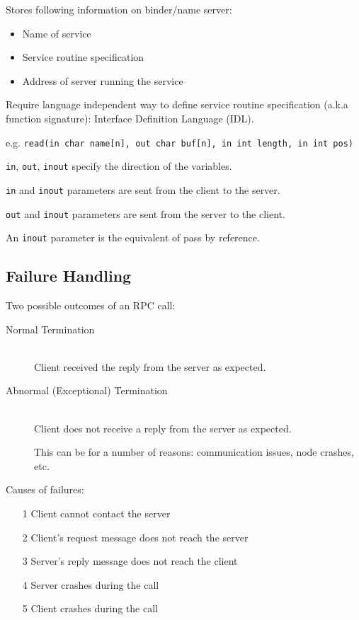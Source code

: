 \documentclass[a4paper]{article}
\begin{document}
Stores following information on binder/name server:

\begin{itemize}
  \item Name of service
  \item Service routine specification
  \item Address of server running the service
\end{itemize}

Require language independent way to define service routine specification
(a.k.a function signature): Interface Definition Language (IDL).

e.g. \texttt{read(in char name[n], out char buf[n], in int length, in int pos)}

\texttt{in}, \texttt{out}, \texttt{inout} specify the direction of the
variables.

\texttt{in} and \texttt{inout} parameters are sent from the client to the
server.

\texttt{out} and \texttt{inout} parameters are sent from the server to the
client.

An \texttt{inout} parameter is the equivalent of pass by reference.

\subsection{Failure Handling}

Two possible outcomes of an RPC call:

\begin{description}
  \item[Normal Termination] \hfill \\
    Client received the reply from the server as expected.

  \item[Abnormal (Exceptional) Termination] \hfill \\
    Client does not receive a reply from the server as expected.

    This can be for a number of reasons: communication issues, node crashes,
    etc.

\end{description}

Causes of failures:

\begin{itemize}
  \item[1] Client cannot contact the server
  \item[2] Client's request message does not reach the server
  \item[3] Server's reply message does not reach the client
  \item[4] Server crashes during the call
  \item[5] Client crashes during the call
\end{itemize}
\end{document}
